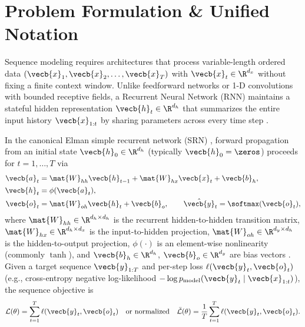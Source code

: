 \documentclass[../../../../master.tex]{subfiles}
\begin{document}

\section{Problem Formulation \& Unified Notation}
\label{sec:rnn:problem}

Sequence modeling requires architectures that process variable-length ordered data $(\vecb{x}_1, \vecb{x}_2, \dots, \vecb{x}_T)$ with $\vecb{x}_t \in \R^{d_x}$ without fixing a finite context window. Unlike feedforward networks or 1-D convolutions with bounded receptive fields, a Recurrent Neural Network (RNN) maintains a stateful hidden representation $\vecb{h}_t \in \R^{d_h}$ that summarizes the entire input history $\vecb{x}_{1:t}$ by sharing parameters across every time step .

In the canonical Elman simple recurrent network (SRN) , forward propagation from an initial state $\vecb{h}_0 \in \R^{d_h}$ (typically $\vecb{h}_0 = \zeros$) proceeds for $t = 1, \dots, T$ via
\begin{align}
  \vecb{a}_t &= \mat{W}_{hh}\vecb{h}_{t-1} + \mat{W}_{hx}\vecb{x}_t + \vecb{b}_h,
  \label{eq:rnn:elman_pre} \\
  \vecb{h}_t &= \phi(\vecb{a}_t),
  \label{eq:rnn:elman_state} \\
  \vecb{o}_t &= \mat{W}_{oh}\vecb{h}_t + \vecb{b}_o, \qquad \hat{\vecb{y}}_t = \softmax(\vecb{o}_t),
  \label{eq:rnn:elman_out}
\end{align}
where $\mat{W}_{hh} \in \R^{d_h \times d_h}$ is the recurrent hidden-to-hidden transition matrix, $\mat{W}_{hx} \in \R^{d_h \times d_x}$ is the input-to-hidden projection, $\mat{W}_{oh} \in \R^{d_y \times d_h}$ is the hidden-to-output projection, $\phi(\cdot)$ is an element-wise nonlinearity (commonly $\tanh$), and $\vecb{b}_h \in \R^{d_h}$, $\vecb{b}_o \in \R^{d_y}$ are bias vectors . Given a target sequence $\vecb{y}_{1:T}$ and per-step loss $\ell(\vecb{y}_t, \vecb{o}_t)$ (e.g., cross-entropy negative log-likelihood $-\log p_{\text{model}}(\vecb{y}_t \mid \vecb{x}_{1:t})$), the sequence objective is
\begin{equation}
  \mathcal{L}(\theta) = \sum_{t=1}^{T} \ell(\vecb{y}_t, \vecb{o}_t)
  \quad\text{or normalized}\quad
  \bar{\mathcal{L}}(\theta) = \frac{1}{T} \sum_{t=1}^{T} \ell(\vecb{y}_t, \vecb{o}_t).
  \label{eq:rnn:seq_loss}
\end{equation}
\end{document}
